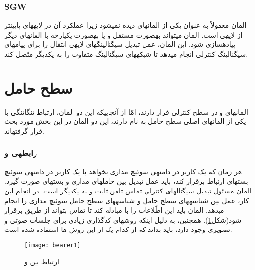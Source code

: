 \subsubsection{SGW}
 
المان  معمولاً به عنوان یکی از المان\nf های  دیده نمی\nf شود زیرا عملکرد آن در لایه\nf های پایین\nf تر از لایه\nf ی  است. المان  می\nf تواند به\nf صورت مستقل و یا به\nf صورت یکپارچه با المان\nf های دیگر پیاده\nf سازی شود. این المان، عمل تبدیل سیگنالینگ\nf های لایه\nf ی انتقال را برای پیام\nf های سیگنالینگ کنترلی انجام می\nf دهد تا شبکه\nf های سیگنالینگ متفاوت را به یکدیگر متّصل کند.


\section{سطح حامل}

المان\nf های  و  در سطح کنترلی قرار دارند، امّا از آنجایی\nf که این دو المان، ارتباط تنگاتنگی با یکی از المان\nf های اصلی سطح حامل به نام  دارند، این دو المان در این بخش مورد بحث قرار گرفته\nf اند.


\subsubsection{رابطه\nf ی  و }

هر زمان که یک کاربر در دامنه\nf ی سوئیچ مداری بخواهد با یک کاربر در دامنه\nf ی سوئیچ بسته\nf ای ارتباط برقرار کند، باید عمل تبدیل بین حامل\nf های مداری و بسته\nf ای صورت گیرد. المان  مسئول تبدیل سیگنال\nf های کنترلی تماس تلفن ثابت و  به یکدیگر است. در انجام این کار،  عمل  بین شناسه\nf های سطح حامل  و شناسه\nf های سطح حامل سوئيچ مداری را انجام می\nf دهد. المان  باید این اطّلاعات را با  مبادله کند تا تماس بتواند از طریق  برقرار شود(شکل\ref{bearer1}). همچنین، به دلیل این\nf که روش\nf های کدگذاری زیادی برای جلسات صوتی و تصویری وجود دارد،  باید بداند که از کدام یک از این روش ها استفاده شده است.

\begin{figure}[h]
\centering
\texttt{[image: bearer1]}
\caption{ارتباط بین  و }
\label{bearer1}
\end{figure} 

